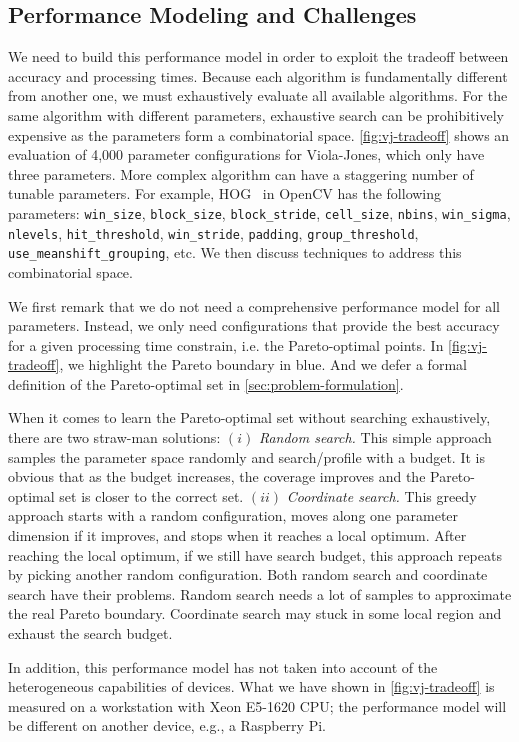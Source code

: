 
\subsection{Performance Modeling and Challenges}

We need to build this performance model in order to exploit the tradeoff between
accuracy and processing times. Because each algorithm is fundamentally different
from another one, we must exhaustively evaluate all available algorithms. For
the same algorithm with different parameters, exhaustive search can be
prohibitively expensive as the parameters form a combinatorial
space. \autoref{fig:vj-tradeoff} shows an evaluation of 4,000 parameter
configurations for Viola-Jones, which only have three parameters. More complex
algorithm can have a staggering number of tunable parameters. For example,
HOG~\cite{dalal2005histograms} in OpenCV has the following parameters:
\texttt{win\_size}, \texttt{block\_size}, \texttt{block\_stride},
\texttt{cell\_size}, \texttt{nbins}, \texttt{win\_sigma}, \texttt{nlevels},
\texttt{hit\_threshold}, \texttt{win\_stride}, \texttt{padding},
\texttt{group\_threshold}, \texttt{use\_meanshift\_grouping}, etc. We then
discuss techniques to address this combinatorial space.

We first remark that we do not need a comprehensive performance model for all
parameters. Instead, we only need configurations that provide the best accuracy
for a given processing time constrain, i.e. the Pareto-optimal points. In
\autoref{fig:vj-tradeoff}, we highlight the Pareto boundary in blue. And we
defer a formal definition of the Pareto-optimal set in
\autoref{sec:problem-formulation}.

When it comes to learn the Pareto-optimal set without searching exhaustively,
there are two straw-man solutions: $(i)$ \textit{Random search.}  This simple
approach samples the parameter space randomly and search/profile with a
budget. It is obvious that as the budget increases, the coverage improves and
the Pareto-optimal set is closer to the correct set. $(ii)$ \textit{Coordinate
  search.} This greedy approach starts with a random configuration, moves along
one parameter dimension if it improves, and stops when it reaches a local
optimum. After reaching the local optimum, if we still have search budget, this
approach repeats by picking another random configuration. Both random search and
coordinate search have their problems. Random search needs a lot of samples to
approximate the real Pareto boundary. Coordinate search may stuck in some local
region and exhaust the search budget.

In addition, this performance model has not taken into account of the
heterogeneous capabilities of devices. What we have shown in
\autoref{fig:vj-tradeoff} is measured on a workstation with Xeon E5-1620 CPU;
the performance model will be different on another device, e.g., a Raspberry Pi.

